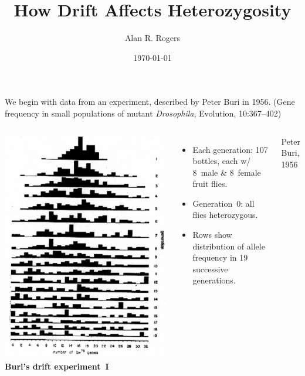 \title{How Drift Affects Heterozygosity}
\author{Alan R. Rogers}
\date{\today}
\frame{\titlepage}

\begin{frame}
We begin with data from an experiment, described by Peter Buri in
1956.  (Gene frequency in small populations of mutant
\emph{Drosophila}, Evolution, 10:367--402)
\end{frame}

\begin{frame}
\begin{columns}
\includegraphics[width=\textwidth]{buridist1.pdf}
{\bf Buri's drift experiment~I}
\begin{itemize}
\item Each generation: 107 bottles, each w/ 
  8~male \& 8~female fruit flies. 
\item Generation~0: all flies heterozygous.
\item Rows show distribution of allele frequency in 19 successive
  generations. 
\end{itemize}
\mbox{}\hfill \small Peter Buri, 1956
\end{columns}
\end{frame}

